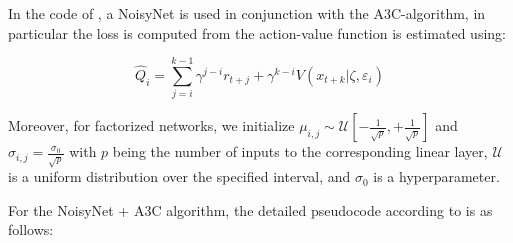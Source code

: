 \noindent In the code of \cite{rle-paper}, a NoisyNet is used in conjunction with the A3C-algorithm, in particular the loss is computed from the action-value function is estimated using:

\begin{equation}
  \hat{Q}_{i} = \sum_{j=i}^{k-1} \gamma^{j-i} r_{t+j} + \gamma^{k-i} V(x_{t+k} | \zeta, \varepsilon_{i})
\end{equation}

Moreover, for factorized networks, we initialize $\mu_{i,j} \sim \mathcal{U}\left[-\frac{1}{\sqrt{p}}, +\frac{1}{\sqrt{p}}\right]$ and $\sigma_{i,j} = \frac{\sigma_{0}}{\sqrt{p}}$ with $p$ being the number of inputs to the corresponding linear layer, $\mathcal{U}$ is a uniform distribution over the specified interval, and $\sigma_{0}$ is a hyperparameter.

\noindent For the NoisyNet + A3C algorithm, the detailed pseudocode according to \cite{noisynet-paper} is as follows:

